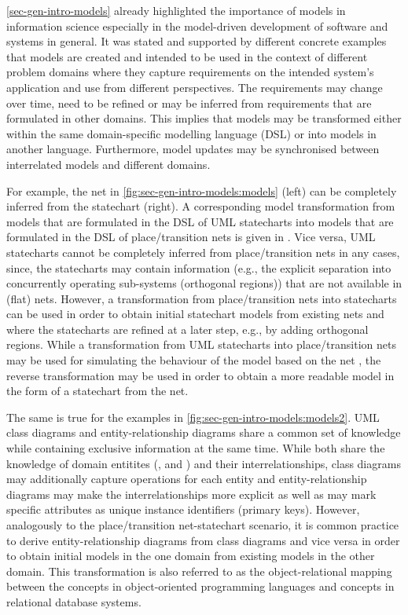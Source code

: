 \cref{sec-gen-intro-models} already highlighted the importance of models in information science especially in the model-driven development of software and systems in general.
It was stated and supported by different concrete examples that models are created and intended to be used in the context of different problem domains where they capture requirements on the intended system's application and use from different perspectives.
The requirements may change over time, need to be refined or may be inferred from requirements that are formulated in other domains.
This implies that models may be transformed either within the same domain-specific modelling language (DSL) or into models in another language.
Furthermore, model updates may be synchronised between interrelated models and different domains.

For example, the net in \cref{fig:sec-gen-intro-models:models} (left) can be completely inferred from the statechart (right).
A corresponding model transformation from models that are formulated in the DSL of UML statecharts into models that are formulated in the DSL of place/transition nets is given in \cite{Ehrig:2006:FAG:1121741}.
Vice versa, UML statecharts cannot be completely inferred from place/transition nets in any cases, since, the statecharts may contain information (e.g., the explicit separation into concurrently operating sub-systems (orthogonal regions)) that are not available in (flat) nets. 
However, a transformation from place/transition nets into statecharts can be used in order to obtain initial statechart models from existing nets and where the statecharts are refined at a later step, e.g., by adding orthogonal regions.
While a transformation from UML statecharts into place/transition nets may be used for simulating the behaviour of the model based on the net \cite{conf/seke/HuS04}, the reverse transformation may be used in order to obtain a more readable model in the form of a statechart from the net.

The same is true for the examples in \cref{fig:sec-gen-intro-models:models2}.
UML class diagrams and entity-relationship diagrams share a common set of knowledge while containing exclusive information at the same time.
While both share the knowledge of domain entitites (,  and ) and their interrelationships, class diagrams may additionally capture operations for each entity and entity-relationship diagrams may make the interrelationships more explicit as well as may mark specific attributes as unique instance identifiers (primary keys).
However, analogously to the place/transition net-statechart scenario, it is common practice to derive entity-relationship diagrams from class diagrams and vice versa in order to obtain initial models in the one domain from existing models in the other domain.
This transformation is also referred to as the object-relational mapping between the concepts in object-oriented programming languages and concepts in relational database systems.

